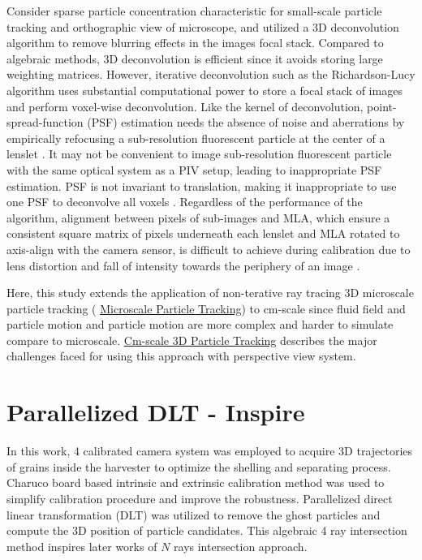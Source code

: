 \documentclass[draftthesis,fullpage]{uiucthesis}
\begin{document}
Consider sparse particle concentration characteristic for small-scale particle tracking and orthographic view of microscope, \citet{levoy2006light} and \citet{ truscott2017three} utilized a 3D deconvolution algorithm to remove blurring effects in the images focal stack. 
Compared to algebraic methods, 3D deconvolution is efficient since it avoids storing large weighting matrices. However, iterative deconvolution such as the Richardson-Lucy algorithm \citep{sibarita2005deconvolution} uses substantial computational power to store a focal stack of images and perform voxel-wise deconvolution. Like the kernel of deconvolution, point-spread-function (PSF) estimation needs the absence of noise and aberrations by empirically refocusing a sub-resolution fluorescent particle at the center of a lenslet \citep{levoy2006light}. It may not be convenient to image sub-resolution fluorescent particle with the same optical system as a PIV setup, leading to inappropriate PSF estimation. PSF is not invariant to translation, making it inappropriate to use one PSF to deconvolve all voxels \citep{zhu2021pre}. Regardless of the performance of the algorithm, alignment between pixels of sub-images and MLA, which ensure a consistent square matrix of pixels underneath each lenslet and MLA rotated to axis-align with the camera sensor, is difficult to achieve during calibration due to lens distortion and fall of intensity towards the periphery of an image \citep{piller2012microscope}.


Here, this study extends the application of non-terative ray tracing 3D microscale particle tracking ( \hyperref[chapter:MPT]{Microscale Particle Tracking}) to cm-scale since fluid field and particle motion and particle motion are more complex and harder to simulate compare to microscale. \hyperref[chapter:cm-scale]{Cm-scale 3D Particle Tracking} 
describes the major challenges faced for using this approach with perspective view system.  

\renewcommand{\cleardoublepage}{} %
\renewcommand{\clearpage}{}
\chapter{Parallelized DLT - Inspire}\label{chapter:DLT}
In this work, 4 calibrated camera system was employed to acquire 3D trajectories of grains inside the harvester to optimize the shelling and separating process. Charuco board \citep{an2018charuco} based intrinsic and extrinsic calibration method was used to simplify calibration procedure and improve the robustness. Parallelized direct linear transformation (DLT) was utilized to remove the ghost particles and compute the 3D position of particle candidates. This algebraic 4 ray intersection method inspires later works of $N$ rays intersection approach. 
\end{document}
